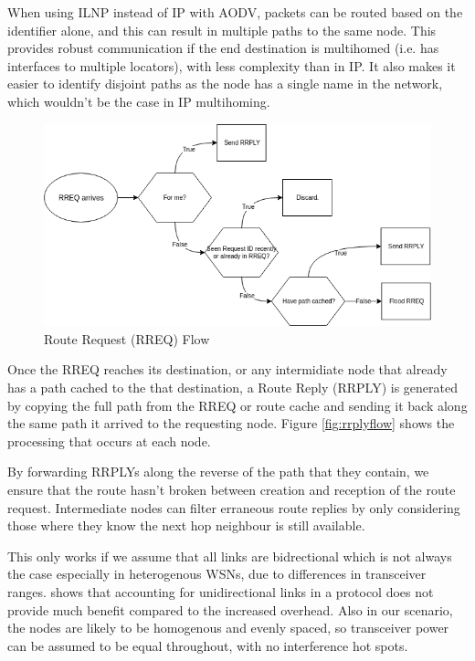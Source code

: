 \documentclass[12pt]{article}
\begin{document}
When using ILNP instead of IP with AODV, packets can be routed based on the identifier alone, and this can result in multiple paths to the same node. This provides robust communication if the end destination is multihomed (i.e. has interfaces to multiple locators), with less complexity than in IP. It also makes it easier to identify disjoint paths as the node has a single name in the network, which wouldn't be the case in IP multihoming. 

\begin{figure}[!ht]
	\centering
	\includegraphics[width=\linewidth]{images/rreqflow}
	\caption{Route Request (RREQ) Flow}
	\label{fig:rreqflow}
\end{figure}

Once the RREQ reaches its destination, or any intermidiate node that already has a path cached to the that destination, a Route Reply (RRPLY) is generated by copying the full path from the RREQ or route cache and sending it back along the same path it arrived to the requesting node. Figure \ref{fig:rrplyflow} shows the processing that occurs at each node.

By forwarding RRPLYs along the reverse of the path that they contain, we ensure that the route hasn't broken between creation and reception of the route request. Intermediate nodes can filter erraneous route replies by only considering those where they know the next hop neighbour is still available.

This only works if we assume that all links are bidrectional which is not always the case especially in heterogenous WSNs, due to differences in transceiver ranges. 
\cite{unidirec} shows that accounting for unidirectional links in a protocol does not provide much benefit compared to the increased overhead. Also in our scenario, the nodes are likely to be homogenous and evenly spaced, so transceiver power can be assumed to be equal throughout, with no interference hot spots. 
\end{document}
